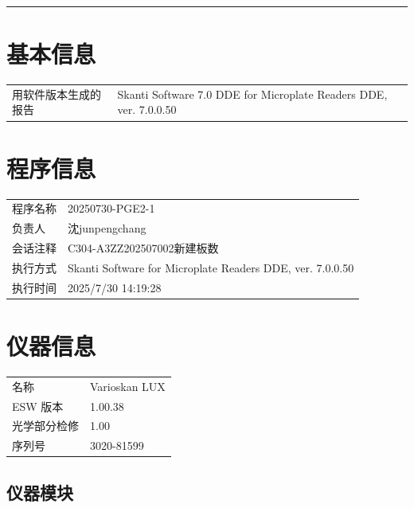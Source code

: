 \documentclass[UTF8,10pt,a4paper,fontset=fandol]{ctexart}
\newcommand{\fieldvalue}[1]{#1}
\begin{document}
\bigskip
\hrule
\bigskip

\section*{基本信息}

\begin{tabularx}{\textwidth}{@{}l X@{}}
用软件版本生成的报告 &
\fieldvalue{Skanti Software 7.0 DDE for Microplate Readers DDE, ver. 7.0.0.50}
\end{tabularx}

\section*{程序信息}

\begin{tabularx}{\textwidth}{@{}l X@{}}
程序名称 &
\fieldvalue{20250730-PGE2-1}
\\
负责人 &
\fieldvalue{沈junpengchang}
\\
会话注释 &
\fieldvalue{C304-A3ZZ202507002新建板数}
\\
执行方式 &
\fieldvalue{Skanti Software for Microplate Readers DDE, ver. 7.0.0.50}
\\
执行时间 &
\fieldvalue{2025/7/30 14:19:28}
\end{tabularx}

\section*{仪器信息}

\begin{tabularx}{\textwidth}{@{}l X@{}}
名称 &
\fieldvalue{Varioskan LUX}
\\
ESW 版本 &
\fieldvalue{1.00.38}
\\
光学部分检修 &
\fieldvalue{1.00}
\\
序列号 &
\fieldvalue{3020-81599}
\end{tabularx}

\subsection*{仪器模块}
\end{document}
